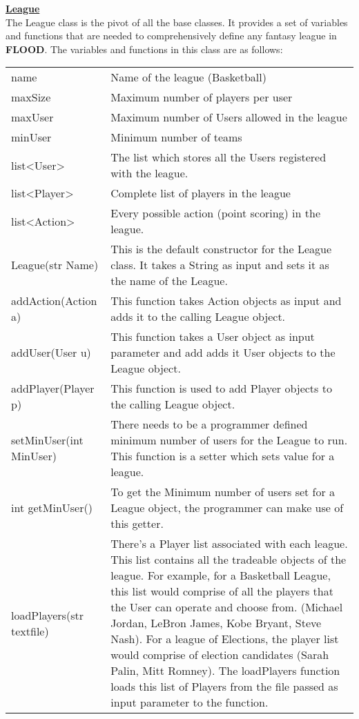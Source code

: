 \documentclass[12pt]{report}
\begin{document}
\begin{doublespace}
\textbf{\underline{League}}
\\
The League class is the pivot of all the base classes. It provides a set of variables and functions that are needed to comprehensively define any fantasy league in \textbf{FLOOD}. The variables and functions in this class are as follows:

\begin{tabular}{ l p{10cm} }
name & Name of the league (Basketball) \\
maxSize & Maximum number of players per user \\
maxUser & Maximum number of Users allowed in the league \\
minUser & Minimum number of teams \\
list<User> & The list which stores all the Users registered with the league. \\
list<Player> & Complete list of players in the league \\
list<Action> & Every possible action (point scoring) in the league. \\

League(str Name) & This is the default constructor for the League class. It takes a String  as input and sets it as the name of the League. \\
addAction(Action a) & This function takes Action objects as input and adds it to the calling League object. \\		
addUser(User u) & This function takes a User object as input parameter and add adds it User objects to the League object. \\
addPlayer(Player p) & This function is used to add Player objects to the calling League object. \\
setMinUser(int MinUser) & There needs to be a programmer defined minimum number of users for the League to run. This function is a setter which sets value for a league. \\
int getMinUser() & To get the Minimum number of users set for a League object, the programmer can make use of this getter. \\
loadPlayers(str textfile) & There's a Player list associated with each league. This list contains all the tradeable objects of the league. For example, for a Basketball League, this list would comprise of all the players that the User can operate and choose from. (Michael Jordan, LeBron James, Kobe Bryant, Steve Nash). For a league of 	Elections, the player list would comprise of election candidates (Sarah Palin, Mitt Romney). The loadPlayers function loads this list of Players from the file passed as input parameter to the function.
\end{tabular}
\end{doublespace}
\end{document}
